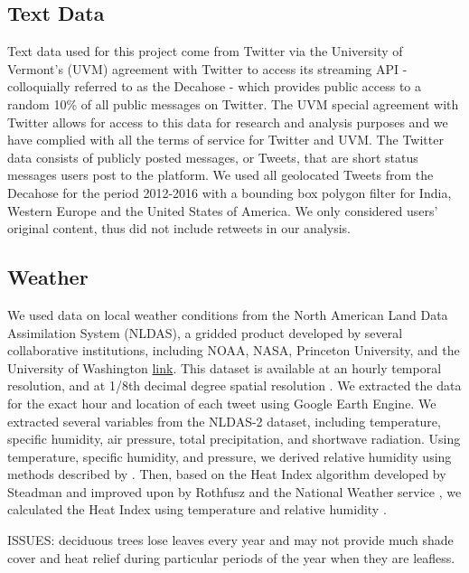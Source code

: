 \documentclass{article}
\begin{document}
\subsection{Text Data}
Text data used for this project come from Twitter via the University of Vermont’s (UVM) agreement with Twitter to access its streaming API - colloquially referred to as the Decahose - which provides public access to a random 10\% of all public messages on Twitter. The UVM special agreement with Twitter allows for access to this data for research and analysis purposes and we have complied with all the terms of service for Twitter and UVM. 
The Twitter data consists of publicly posted messages, or Tweets, that are short status messages users post to the platform. We used all geolocated Tweets from the Decahose for the period 2012-2016 with a bounding box polygon filter for India, Western Europe and the United States of America. We only considered users’ original content, thus did not include retweets in our analysis.

\subsection{Weather}
We used data on local weather conditions from the North American Land Data Assimilation System (NLDAS), a gridded product developed by several collaborative institutions, including NOAA, NASA, Princeton University, and the University of Washington \href{https://agupubs.onlinelibrary.wiley.com/doi/full/10.1029/2011JD016048}{link}.  This dataset is available at an hourly temporal resolution, and at 1/8th decimal degree spatial resolution \cite{xia_continental-scale_2012}.  We extracted the data for the exact hour and location of each tweet using Google Earth Engine. We extracted several variables from the NLDAS-2 dataset, including temperature, specific humidity, air pressure, total precipitation, and shortwave radiation.  Using temperature, specific humidity, and pressure, we derived relative humidity using methods described by  \cite{bolton_computation_1980}. Then, based on the Heat Index algorithm developed by Steadman \cite{steadman_assessment_1979} and improved upon by Rothfusz and the National Weather service \cite{rothfusz_heat_1990}, we calculated the Heat Index using temperature and relative humidity \cite{heo_comparison_2019}.

ISSUES: deciduous trees lose leaves every year and may not provide much shade cover and heat relief during particular periods of the year when they are leafless.
\end{document}
